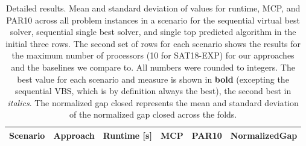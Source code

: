 \begin{table}
\begin{center}
\begin{tabular}{clcccc}
    \end{tabular}    
\end{center}
\end{table}

\begin{table}
\begin{center}
    {\caption[Detailed Results: Runtime, MCP, PAR10, and Normalized Gap Closed for $AS_{p_{\cap}}$ vs. $AS_{kl}$ for SAT18-EXP Scenario]{Detailed results. Mean and standard deviation of values for runtime, MCP, and PAR10 across all problem instances in a scenario for the sequential virtual best solver, sequential single best solver, and single top predicted algorithm in the initial three rows. The second set of rows for each scenario shows the results for the maximum number of processors (10 for SAT18-EXP) for our approaches and the baselines we compare to. All numbers were rounded to integers. The best value for each scenario and measure is shown in \textbf{bold} (excepting the sequential VBS, which is by definition always the best), the second best in \textit{italics}. The normalized gap closed represents the mean and standard deviation of the normalized gap closed across the folds.}\label{tab:summary5-sat18}}
    \scriptsize\begin{tabular}{clcccc}
    \toprule
        Scenario & Approach & Runtime [s] & MCP & PAR10 & NormalizedGap\\
    \midrule
    

\end{tabular}
\end{center}
\end{table}
